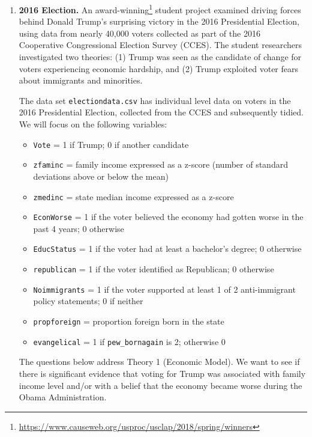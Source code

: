 \documentclass[
]{krantz}
\providecommand{\tightlist}{%
  \setlength{\itemsep}{0pt}\setlength{\parskip}{0pt}}
\renewcommand{\href}[2]{#2\footnote{\url{#1}}}
\begin{document}
\begin{enumerate}
\def\labelenumi{\arabic{enumi}.}
\setcounter{enumi}{4}
\item
  \textbf{2016 Election.} An \href{https://www.causeweb.org/usproc/usclap/2018/spring/winners}{award-winning} student project \citep{Renier2018} examined driving forces behind Donald Trump's surprising victory in the 2016 Presidential Election, using data from nearly 40,000 voters collected as part of the 2016 Cooperative Congressional Election Survey (CCES). The student researchers investigated two theories: (1) Trump was seen as the candidate of change for voters experiencing economic hardship, and (2) Trump exploited voter fears about immigrants and minorities.

  The data set \texttt{electiondata.csv} has individual level data on voters in the 2016 Presidential Election, collected from the CCES and subsequently tidied. We will focus on the following variables:

  \begin{itemize}
  \tightlist
  \item
    \texttt{Vote} = 1 if Trump; 0 if another candidate
  \item
    \texttt{zfaminc} = family income expressed as a z-score (number of standard deviations above or below the mean)
  \item
    \texttt{zmedinc} = state median income expressed as a z-score
  \item
    \texttt{EconWorse} = 1 if the voter believed the economy had gotten worse in the past 4 years; 0 otherwise
  \item
    \texttt{EducStatus} = 1 if the voter had at least a bachelor's degree; 0 otherwise
  \item
    \texttt{republican} = 1 if the voter identified as Republican; 0 otherwise
  \item
    \texttt{Noimmigrants} = 1 if the voter supported at least 1 of 2 anti-immigrant policy statements; 0 if neither
  \item
    \texttt{propforeign} = proportion foreign born in the state
  \item
    \texttt{evangelical} = 1 if \texttt{pew\_bornagain} is 2; otherwise 0
  \end{itemize}

  The questions below address Theory 1 (Economic Model). We want to see if there is significant evidence that voting for Trump was associated with family income level and/or with a belief that the economy became worse during the Obama Administration.


\end{enumerate}
\end{document}
